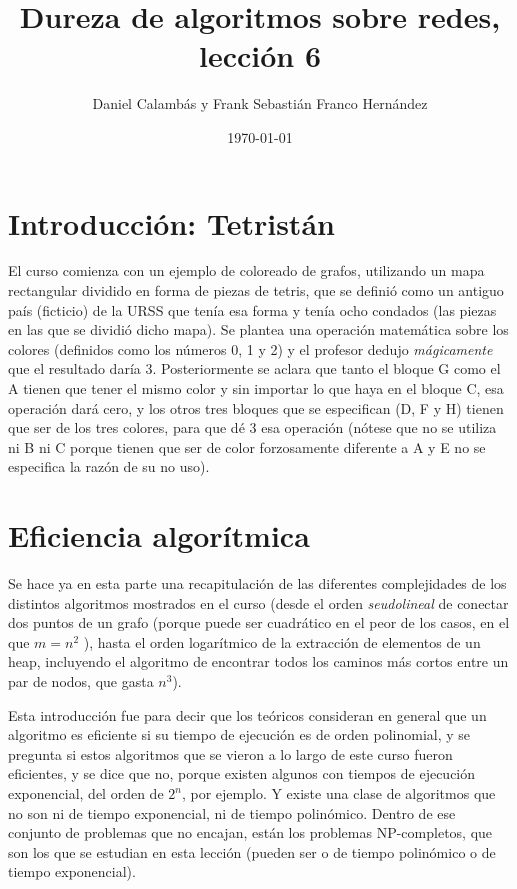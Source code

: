 \documentclass[a4paper]{article}
\title{Dureza de algoritmos sobre redes, lección 6}
\author{Daniel Calambás y Frank Sebastián Franco Hernández}
\date{\today}
\begin{document}
\maketitle


\section{Introducción: Tetristán}

El curso comienza con un ejemplo de coloreado de grafos, utilizando un mapa rectangular dividido en forma de piezas de tetris, que se definió como un antiguo país (ficticio) de la URSS que tenía esa forma y tenía ocho condados (las piezas en las que se dividió dicho mapa). Se plantea una operación matemática sobre los colores (definidos como los números 0, 1 y 2) y el profesor dedujo \textit{mágicamente} que el resultado daría 3. Posteriormente se aclara que tanto el bloque G como el A tienen que tener el mismo color y sin importar lo que haya en el bloque C, esa operación dará cero, y los otros tres bloques que se especifican (D, F y H) tienen que ser de los tres colores, para que dé 3 esa operación (nótese que no se utiliza ni B ni C porque tienen que ser de color forzosamente diferente a A y E no se especifica la razón de su no uso).


\section{Eficiencia algorítmica}

Se hace ya en esta parte una recapitulación de las diferentes complejidades de los distintos algoritmos mostrados en el curso (desde el orden \textit{seudolineal} de conectar dos puntos de un grafo (porque puede ser cuadrático en el peor de los casos, en el que \(m=n^2\) ), hasta el orden logarítmico de la extracción de elementos de un heap, incluyendo el algoritmo de encontrar todos los caminos más cortos entre un par de nodos, que gasta \(n^3\)). 

Esta introducción fue para decir que los teóricos consideran en general que un algoritmo es eficiente si su tiempo de ejecución es de orden polinomial, y se pregunta si estos algoritmos que se vieron a lo largo de este curso fueron eficientes, y se dice que no, porque existen algunos con tiempos de ejecución exponencial, del orden de \(2^n\), por ejemplo. Y existe una clase de algoritmos que no son ni de tiempo exponencial, ni de tiempo polinómico. Dentro de ese conjunto de problemas que no encajan, están los problemas NP-completos, que son los que se estudian en esta lección (pueden ser o de tiempo polinómico o de tiempo exponencial). 
\end{document}
